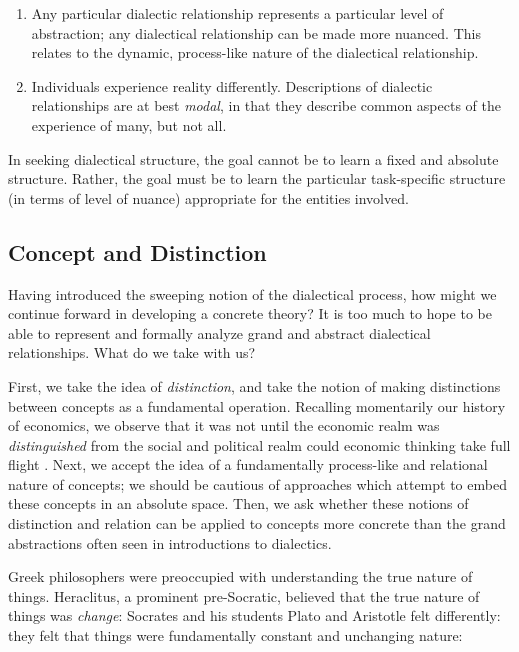 \begin{enumerate}
	\item Any particular dialectic relationship represents a particular level of abstraction; any dialectical relationship can be made more nuanced. This relates to the dynamic, process-like nature of the dialectical relationship.
	\item Individuals experience reality differently. Descriptions of dialectic relationships are at best \textit{modal}, in that they describe common aspects of the experience of many, but not all.
\end{enumerate}

In seeking dialectical structure, the goal cannot be to learn a fixed and absolute structure. Rather, the goal must be to learn the particular task-specific structure (in terms of level of nuance) appropriate for the entities involved.

\subsection{Concept and Distinction}

Having introduced the sweeping notion of the dialectical process, how might we continue forward in developing a concrete theory?
It is too much to hope to be able to represent and formally analyze grand and abstract dialectical relationships.
What do we take with us?

First, we take the idea of \textit{distinction}, and take the notion of making distinctions between concepts as a fundamental operation.
Recalling momentarily our history of economics, we observe that it was not until the economic realm was \textit{distinguished} from the social and political realm could economic thinking take full flight \citep{heilbroner}.
Next, we accept the idea of a fundamentally process-like and relational nature of concepts; we should be cautious of approaches which attempt to embed these concepts in an absolute space.
Then, we ask whether these notions of distinction and relation can be applied to concepts more concrete than the grand abstractions often seen in introductions to dialectics.

\bigskip

Greek philosophers were preoccupied with understanding the true nature of things.
Heraclitus, a prominent pre-Socratic, believed that the true nature of things was \textit{change}: 
Socrates and his students Plato and Aristotle felt differently: they felt that things were fundamentally constant and unchanging nature: 

